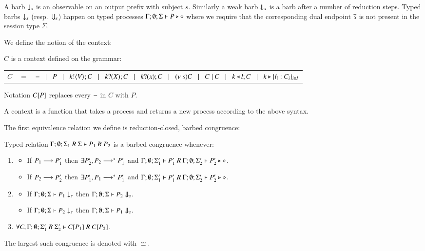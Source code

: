 A barb $\downarrow_{s}$ is an observable on an output prefix with subject $s$.
Similarly a weak barb $\Downarrow_{s}$ is a barb after a number of reduction steps.
Typed barbs $\downarrow_{s}$ (resp.\ $\Downarrow_{s}$)
happen on typed processes $\Gamma; \emptyset; \Sigma \vdash P \triangleright \diamond$
where we require that the corresponding dual endpoint $\overline{s}$ is not present
in the session type $\Sigma$.

We define the notion of the context:

\begin{definition}[Context]\rm
	$C$ is a context defined on the grammar:

	\begin{tabular}{rcl}
		$C$ &$=$& $- \;\;\;|\;\;\; P \;\;\;|\;\;\; k ! \langle V \rangle ; C \;\;\;|\;\;\; k ? (X) ; C \;\;\;|\;\;\; k ? (x) ; C \;\;\;|\;\;\; (\nu\ s) C \;\;\;|\;\;\; C \;|\; C \;\;\;|\;\;\; k \triangleleft l ; C \;\;\;|\;\;\; k \triangleright \{l_i:C_i\}_{i \in I}$
	\end{tabular}
	Notation $C[P]$ replaces every $-$ in $C$ with $P$.
\end{definition}

A context is a function that takes a process and returns a new process
according to the above syntax.


The first equivalence relation we define is reduction-closed, barbed congruence:
\begin{definition}\rm
	Typed relation $\Gamma; \emptyset; \Sigma_1\ R\ \Sigma \vdash P_1 \ R\ P_2$ is a barbed congruence
	whenever:
	\begin{enumerate}
		\item
		\begin{itemize}
			\item	If $P_1 \longrightarrow P_1'$ then $\exists P_2', P_2 \longrightarrow^* P_1'$ and $\Gamma; \emptyset; \Sigma_1' \proves P_1'\ R\ \Gamma; \emptyset; \Sigma_2' \proves P_2' \hastype \Proc$.
			\item	If $P_2 \longrightarrow P_2'$ then $\exists P_1', P_1 \longrightarrow^* P_1'$ and $\Gamma; \emptyset; \Sigma_1' \proves P_1'\ R\ \Gamma; \emptyset; \Sigma_2' \proves P_2' \hastype \Proc$.
		\end{itemize}
		\item
		\begin{itemize}
			\item	If $\Gamma;\emptyset;\Sigma \vdash P_1 \downarrow_{s}$ then $\Gamma;\emptyset;\Sigma \vdash P_2 \Downarrow_{s}$.
			\item	If $\Gamma;\emptyset;\Sigma \vdash P_2 \downarrow_{s}$ then $\Gamma;\emptyset;\Sigma \vdash P_1 \Downarrow_{s}$.
		\end{itemize}
		\item	$\forall C, \Gamma; \emptyset; \Sigma_1'\ R\ \Sigma_2' \proves \context{C}{P_1}\ R\ \context{C}{P_2}$.
	\end{enumerate}
	The largest such congruence is denoted with $\cong$.
\end{definition}

